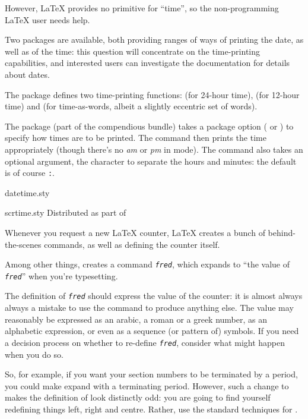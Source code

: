 However, \LaTeX{} provides no primitive for ``time'', so the
non-programming \LaTeX{} user needs help.

Two packages are available, both providing ranges of ways of printing
the date, as well as of the time: this question will concentrate on
the time-printing capabilities, and interested users can investigate
the documentation for details about dates.

The  package defines two time-printing functions:
 (for 24-hour time),  (for 12-hour time) and
 (for time-as-words, albeit a slightly eccentric set of
words).

The  package (part of the compendious
 bundle) takes a package option ( or
) to specify how times are to be printed.  The command
 then prints the time appropriately (though there's no
\emph{am} or \emph{pm} in  mode).  The 
command also takes an optional argument, the character to separate the
hours and minutes: the default is of course \texttt{:}.
\begin{ctanrefs}
\item[datetime.sty]
\item[scrtime.sty]Distributed as part of 
\end{ctanrefs}


Whenever you request a new \LaTeX{} counter, \LaTeX{} creates a bunch
of behind-the-scenes commands, as well as defining the counter
itself.

Among other things,  creates a command
\texttt{\emph{fred}}, which expands to ``the value of
\texttt{\emph{fred}}'' when you're typesetting.

The definition of \texttt{\emph{fred}} should express the
value of the counter: it is almost always always a mistake to use the
command to produce anything else.  The value may reasonably be
expressed as an arabic, a roman or a greek number, as an alphabetic
expression, or even as a sequence (or pattern of) symbols.  If you
need a decision process on whether to re-define
\texttt{\emph{fred}}, consider what might happen when you do
so.

So, for example, if you want your section numbers to be terminated by
a period, you could make  expand with a terminating
period.  However, such a change to  makes the
definition of  look distinctly odd: you are going to
find yourself redefining things left, right and centre.  Rather, use
the standard techniques for %
. 

